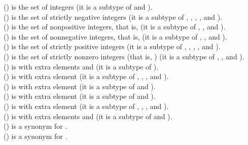 \begin{tabbing}
 () is the set of integers
(it is a subtype of  and ).
\\
 () is the set of strictly negative integers
(it is a subtype of , , , , and ).
\\
 () is the set of nonpositive integers, that is, 
(it is a subtype of , , and ).
\\
 () is the set of nonnegative integers, that is, 
(it is a subtype of , , and ).
\\
 () is the set of strictly positive integers
(it is a subtype of , , , , and ).
\\
 () is the set of strictly nonzero integers (that is, )
(it is a subtype of , , and ).
\\
 () is  with extra elements \EXP{+\infty} and \EXP{-\infty}
(it is a subtype of ).
\\
 () is  with extra element \EXP{-\infty}
(it is a subtype of , , , and ).
\\
 () is  with extra element \EXP{-\infty}
(it is a subtype of  and ).
\\
 () is  with extra element \EXP{+\infty}
(it is a subtype of  and ).
\\
 () is  with extra element \EXP{+\infty}
(it is a subtype of , , , and ).
\\
 () is
 with extra elements \EXP{+\infty} and \EXP{-\infty}
(it is a subtype of  and ).
\\
 () is a synonym for .
\\
 () is a synonym for .
\end{tabbing}

